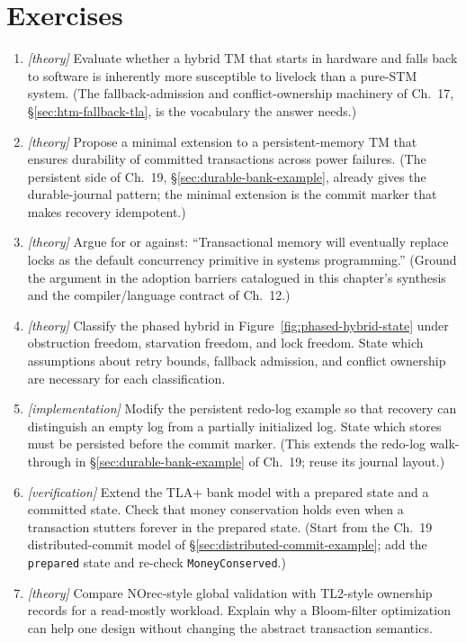 \section{Exercises}
\begin{enumerate}
    \item \emph{[theory]} Evaluate whether a hybrid TM that starts in hardware and falls back to software is inherently more susceptible to livelock than a pure-STM system.  (The fallback-admission and conflict-ownership machinery of Ch.~17, \S\ref{sec:htm-fallback-tla}, is the vocabulary the answer needs.)
    \item \emph{[theory]} Propose a minimal extension to a persistent-memory TM that ensures durability of committed transactions across power failures.  (The persistent side of Ch.~19, \S\ref{sec:durable-bank-example}, already gives the durable-journal pattern; the minimal extension is the commit marker that makes recovery idempotent.)
    \item \emph{[theory]} Argue for or against: “Transactional memory will eventually replace locks as the default concurrency primitive in systems programming.”  (Ground the argument in the adoption barriers catalogued in this chapter's synthesis and the compiler/language contract of Ch.~12.)
    \item \emph{[theory]} Classify the phased hybrid in Figure~\ref{fig:phased-hybrid-state} under obstruction freedom, starvation freedom, and lock freedom. State which assumptions about retry bounds, fallback admission, and conflict ownership are necessary for each classification.
    \item \emph{[implementation]} Modify the persistent redo-log example so that recovery can distinguish an empty log from a partially initialized log. State which stores must be persisted before the commit marker.  (This extends the redo-log walk-through in \S\ref{sec:durable-bank-example} of Ch.~19; reuse its journal layout.)
    \item \emph{[verification]} Extend the TLA+ bank model with a prepared state and a committed state. Check that money conservation holds even when a transaction stutters forever in the prepared state.  (Start from the Ch.~19 distributed-commit model of \S\ref{sec:distributed-commit-example}; add the \texttt{prepared} state and re-check \texttt{MoneyConserved}.)
    \item \emph{[theory]} Compare NOrec-style global validation with TL2-style ownership records for a read-mostly workload. Explain why a Bloom-filter optimization can help one design without changing the abstract transaction semantics.

\end{enumerate}
